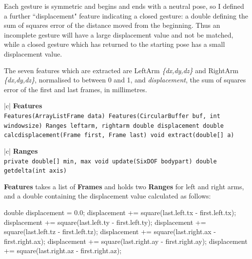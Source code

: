 \documentclass[12pt,a4,notitlepage]{report}
\renewcommand{\_}{\texttt{\symbol{95}}}
\newcommand{\<}{\texttt{\symbol{60}}}
\renewcommand{\>}{\texttt{\symbol{62}}}
\newcommand{\class}[1]{\textbf{#1}}
\newcommand{\variable}[1]{\texttt{#1}}
\begin{document}
Each gesture is symmetric and begins and ends with a neutral pose, so I
defined a further ``displacement" feature indicating a closed gesture: a
double defining the sum of squares error of the distance moved from the
beginning. Thus an incomplete gesture will have a
large displacement value and not be matched, while a closed gesture
which has returned to the starting pose has a small displacement value.

The seven features which are extracted are LeftArm {\em\{dx,dy,dz\}} and
RightArm {\em\{dx,dy,dz\}}, normalised to between 0 and 1, and {\em
displacement}, the sum of squares error of the first and last frames, in
millimetres.

\begin{tabular}{|c|} \hline 
\class{Features} \\ \hline
{}
{\variable{Features(ArrayList\<Frame\> data) \newline
Features(CircularBuffer buf, int windowsize) \newline
Ranges leftarm, rightarm \newline
double displacement \newline
double calc\_displacement(Frame first, Frame last) \newline
void extract(double[] a)
} } \\ \hline
\end{tabular}

\begin{tabular}{|c|} \hline 
\class{Ranges} \\ \hline
{}
{\variable{private double[] min, max \newline
void update(SixDOF bodypart) \newline
double get\_delta(int axis)
} } \\ \hline
\end{tabular}

\class{Features} takes a list of \class{Frames} and holds two \class{Ranges} for left and right arms, and a double containing the displacement value calculated as follows:
\begin{code}
double displacement = 0.0;
displacement += square(last.left.tx - first.left.tx);
displacement += square(last.left.ty - first.left.ty);
displacement += square(last.left.tz - first.left.tz);
displacement += square(last.right.ax - first.right.ax);
displacement += square(last.right.ay - first.right.ay);
displacement += square(last.right.az - first.right.az);
\end{code}
\end{document}
